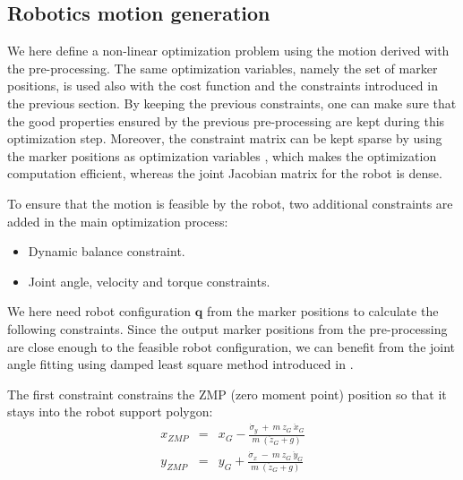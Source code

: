 \documentclass[letterpaper, 10 pt, conference]{ieeeconf}  %
\begin{document}


\subsection{Robotics motion generation}


We here define a non-linear optimization problem using the motion
derived with the pre-processing. 
The same optimization variables, namely the set of marker positions,
is used also with the cost function and the constraints introduced in
the previous section.
By keeping the previous constraints, one can make sure that the good
properties ensured by the previous pre-processing are kept during this
optimization step.
Moreover, the constraint matrix can be kept sparse by 
using the marker positions as optimization variables 
\cite{Komura10}, which makes the optimization computation efficient,
whereas the joint Jacobian matrix for the robot is dense.

To ensure that the motion is feasible by the robot, two
additional constraints are added in the main optimization process:
\begin{itemize}
\item Dynamic balance constraint.
\item Joint angle, velocity and torque constraints.
\end{itemize}

We here need robot configuration $\mathbf{q}$ from the marker
positions to calculate the following constraints.
Since the output marker positions from the pre-processing are close
enough to the feasible robot configuration, we can benefit from the
joint angle fitting using damped least square method introduced in
\cite{Nakaoka12Humanoids}. 
 
The first constraint constrains the ZMP (zero moment point) position
so that it stays into the robot support polygon:
\begin{equation}
  \begin{array}{ccc}
    x_{ZMP} &=& x_G - \frac{\dot{\sigma}_y\ +\ m\ z_G\ \ddot{x}_G}{m\ (\ddot{z}_G + g)} \\
    y_{ZMP} &=& y_G + \frac{\dot{\sigma}_x\ -\ m\ z_G\ \ddot{y}_G}{m\ (\ddot{z}_G + g)}
    \end{array}
\label{eq:zmp}
\end{equation}
\end{document}
